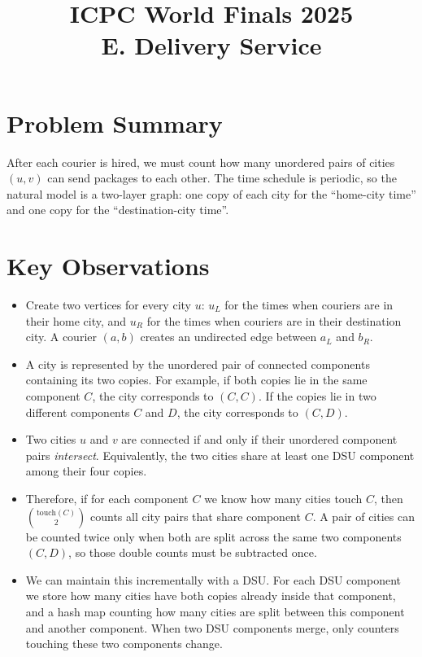 \documentclass[11pt]{article}
\title{ICPC World Finals 2025\\E. Delivery Service}
\author{}
\date{}
\begin{document}
\maketitle

\section*{Problem Summary}

After each courier is hired, we must count how many unordered pairs of cities $(u,v)$ can send packages
to each other. The time schedule is periodic, so the natural model is a two-layer graph: one copy of each
city for the ``home-city time'' and one copy for the ``destination-city time''.

\section*{Key Observations}

\begin{itemize}[leftmargin=*]
    \item Create two vertices for every city $u$:
    $u_L$ for the times when couriers are in their home city, and $u_R$ for the times when couriers are in
    their destination city.
    A courier $(a,b)$ creates an undirected edge between $a_L$ and $b_R$.
    \item A city is represented by the unordered pair of connected components containing its two copies.
    For example, if both copies lie in the same component $C$, the city corresponds to $(C,C)$.
    If the copies lie in two different components $C$ and $D$, the city corresponds to $(C,D)$.
    \item Two cities $u$ and $v$ are connected if and only if their unordered component pairs
    \emph{intersect}. Equivalently, the two cities share at least one DSU component among their four
    copies.
    \item Therefore, if for each component $C$ we know how many cities touch $C$, then
    $\binom{\text{touch}(C)}{2}$ counts all city pairs that share component $C$.
    A pair of cities can be counted twice only when both are split across the same two components
    $(C,D)$, so those double counts must be subtracted once.
    \item We can maintain this incrementally with a DSU.
    For each DSU component we store how many cities have both copies already inside that component, and
    a hash map counting how many cities are split between this component and another component.
    When two DSU components merge, only counters touching these two components change.
\end{itemize}
\end{document}
